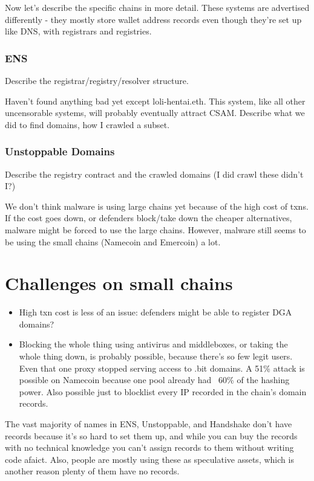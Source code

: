 \documentclass[10pt,sigconf,letterpaper]{acmart}
\begin{document}
Now let's describe the specific chains in more detail. These 
systems are advertised differently - they mostly store 
wallet address records even though they're set up like DNS, 
with registrars and registries. 

\subsubsection{ENS}

Describe the registrar/registry/resolver structure.

Haven't found anything bad yet except loli-hentai.eth. This 
system, like all other uncensorable systems, will probably 
eventually attract CSAM. Describe what we did to find 
domains, how I crawled a subset.

\subsubsection{Unstoppable Domains}

Describe the registry contract and the crawled domains (I did 
crawl these didn't I?)

We don't think malware is using large chains yet because of 
the high cost of txns. If the cost goes down, or defenders 
block/take down the cheaper alternatives, malware might be 
forced to use the large chains. However, malware still seems 
to be using the small chains (Namecoin and Emercoin) a lot.

\section{Challenges on small chains}
\begin{itemize}
	\item High txn cost is less of an issue: defenders might 
	be able to register DGA domains? 
	\item Blocking the whole thing using antivirus and 
	middleboxes, or taking the whole thing down, is probably 
	possible, because there's so few legit users. Even that 
	one proxy stopped serving access to .bit domains. A 51\% 
	attack is possible on Namecoin because one pool already 
	had ~60\% of the hashing power. Also possible just to 
	blocklist every IP recorded in the chain's domain records.
\end{itemize}

The vast majority of names in ENS, Unstoppable, and Handshake 
don't have records because it's so hard to set them up, and 
while you can buy the records with no technical knowledge you 
can't assign records to them without writing code afaict. 
Also, people are mostly using these as speculative assets, 
which is another reason plenty of them have no records.
\end{document}
